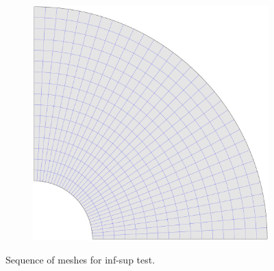 \begin{figure}
\begin{subfigure}[b]{0.18\linewidth}
    \end{subfigure}
    \begin{subfigure}[b]{0.18\linewidth}        %
        \centering
        \includegraphics[width=\linewidth]{mesh_hole_4}
    \end{subfigure}
    \caption{Sequence of meshes for inf-sup test.}
    \label{fig:mesh_hole}
\end{figure}


